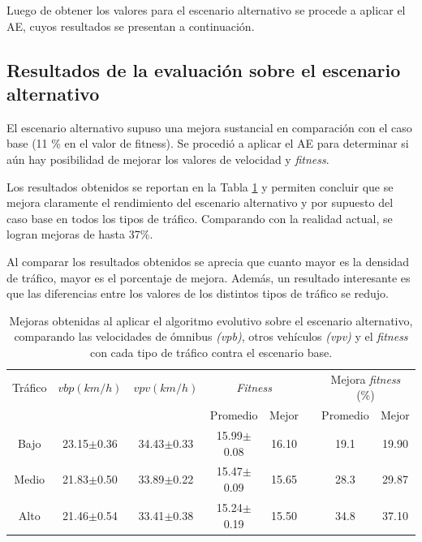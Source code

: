 Luego de obtener los valores para el escenario alternativo se procede a aplicar el AE, cuyos resultados se presentan a continuación.


\subsection{Resultados de la evaluación sobre el escenario alternativo}

El escenario alternativo supuso una mejora sustancial en comparación con el caso base (11 \% en el valor de fitness). Se procedió a aplicar el AE para determinar si aún hay posibilidad de mejorar los valores de velocidad y \emph{fitness}.


Los resultados obtenidos se reportan en la Tabla \ref{table:mejoras_trafico_alternativo_algoritmo} y permiten concluir que se mejora claramente el rendimiento del escenario alternativo y por supuesto del caso base en todos los tipos de tráfico. Comparando con la realidad actual, se logran mejoras de hasta 37\%. 

Al comparar los resultados obtenidos se aprecia que cuanto mayor es la densidad de tráfico, mayor es el porcentaje de mejora. Además, un resultado interesante es que las diferencias entre los valores de los distintos tipos de tráfico se redujo.

\begin{table}[h]
	\renewcommand{\arraystretch}{1.2}
	\caption[Valores numéricos al aplicar el AE sobre el escenario alternativo.]{Mejoras obtenidas al aplicar el algoritmo evolutivo sobre el escenario alternativo, comparando las velocidades de ómnibus \textit{(vpb)}, otros vehículos \textit{(vpv)} y el \emph{fitness} con cada tipo de tráfico contra el escenario base.}
	\label{table:mejoras_trafico_alternativo_algoritmo}
	\centering
	\begin{tabular}{cccccccc}
		\hline 
		Tráfico& 
		$vbp(km/h)$& 
		$vpv(km/h)$&
		\multicolumn{2}{c}{\emph{Fitness}}&  & 
		\multicolumn{2}{c}{Mejora \emph{fitness} (\%)}\\  \cline{4-5} \cline{7-8}&     &     & \multicolumn{1}{c}{Promedio} & \multicolumn{1}{c}{Mejor} &  & \multicolumn{1}{c}{Promedio} & \multicolumn{1}{c}{Mejor} \\ \hline

		Bajo & 23.15$\pm$0.36 & 34.43$\pm$0.33 & 15.99$\pm$0.08 & 16.10 & & 19.1& 19.90 \\
		Medio & 21.83$\pm$0.50  & 33.89$\pm$0.22 & 15.47$\pm$0.09& 15.65 & & 28.3 & 29.87\\
		Alto & 21.46$\pm$0.54  & 33.41$\pm$0.38 & 15.24$\pm$0.19& 15.50 & & 34.8 & 37.10\\	
		\hline		    
	\end{tabular}
\end{table}

